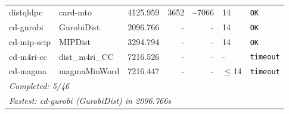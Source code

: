 \begin{longtable}{llrrrl p{}}
distqldpc & card-mto & 4125.959 & 3652 & \textasciitilde{}7066 & 14 & \texttt{OK} \\
cd-gurobi & GurobiDist & 2096.766 & - & - & 14 & \texttt{OK} \\
cd-mip-scip & MIPDist & 3294.794 & - & - & 14 & \texttt{OK} \\
cd-m4ri-cc & dist\_m4ri\_CC & 7216.526 & - & - & - & \texttt{timeout} \\
cd-magma & magmaMinWord & 7216.447 & - & - & $\leq$14 & \texttt{timeout} \\
\midrule
\multicolumn{7}{l}{\textit{Completed: 5/46}} \\
\multicolumn{7}{l}{\textit{Fastest: cd-gurobi (GurobiDist) in 2096.766s}} \\
\end{longtable}
